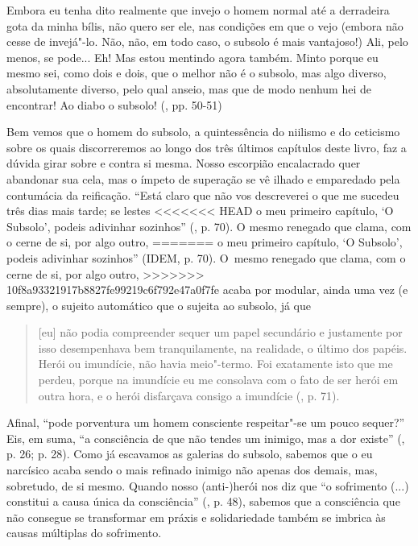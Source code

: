 {Embora eu tenha dito realmente que invejo o homem normal até a
derradeira gota da minha bílis, não quero ser ele, nas condições em que
o vejo (embora não cesse de invejá"-lo. Não, não, em todo caso, o subsolo
é mais vantajoso!) Ali, pelo menos, se pode... Eh! Mas estou mentindo
agora também. Minto porque eu mesmo sei, como dois e dois, que o melhor
não é o subsolo, mas algo diverso, absolutamente diverso, pelo qual
anseio, mas que de modo nenhum hei de encontrar! Ao diabo o subsolo!
(, pp. 50-51)

Bem vemos que o homem do subsolo, a quintessência do niilismo e do
ceticismo sobre os quais discorreremos ao longo dos três últimos
capítulos deste livro, faz a dúvida girar sobre e contra si mesma. Nosso
escorpião encalacrado quer abandonar sua cela, mas o ímpeto de superação
se vê ilhado e emparedado pela contumácia da reificação. ``Está claro
que não vos descreverei o que me sucedeu três dias mais tarde; se lestes
<<<<<<< HEAD
o meu primeiro capítulo, `O Subsolo', podeis adivinhar sozinhos'' (,
p. 70). O mesmo renegado que clama, com o cerne de si, por algo outro,
=======
o meu primeiro capítulo, `O Subsolo', podeis adivinhar sozinhos'' (IDEM,
p. 70). O~mesmo renegado que clama, com o cerne de si, por algo outro,
>>>>>>> 10f8a93321917b8827fe99219c6f792e47a0f7fe
acaba por modular, ainda uma vez (e sempre), o sujeito automático que o
sujeita ao subsolo, já que

\begin{quote}
{[}eu{]} não podia compreender sequer um papel secundário e justamente
por isso desempenhava bem tranquilamente, na realidade, o último dos
papéis. Herói ou imundície, não havia meio"-termo. Foi exatamente isto
que me perdeu, porque na imundície eu me consolava com o fato de ser
herói em outra hora, e o herói disfarçava consigo a imundície (, p.
71).
\end{quote}

Afinal, ``pode porventura um homem consciente respeitar"-se um pouco
sequer?'' Eis, em suma, ``a consciência de que não tendes um inimigo,
mas a dor existe'' (, p. 26; p. 28). Como já escavamos as galerias
do subsolo, sabemos que o eu narcísico acaba sendo o mais refinado
inimigo não apenas dos demais, mas, sobretudo, de si mesmo. Quando nosso
(anti-)herói nos diz que ``o sofrimento (...) constitui a causa única da
consciência'' (, p. 48), sabemos que a consciência que não consegue
se transformar em práxis e solidariedade também se imbrica às causas
múltiplas do sofrimento.

}
